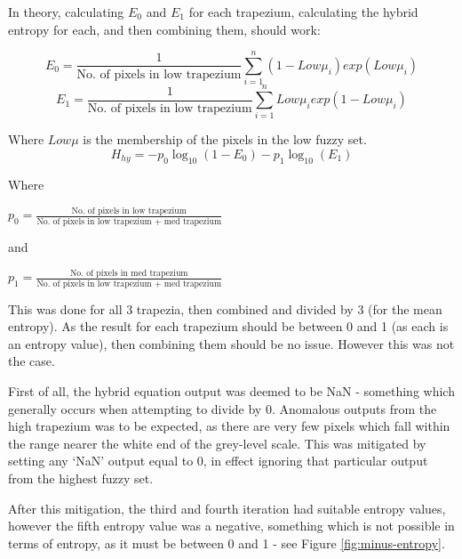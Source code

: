In theory, calculating $E_0$ and $E_1$ for each trapezium, calculating the hybrid entropy for each, and then combining them, should work:

\begin{equation}
E_0 = \frac{1}{\text{No. of pixels in low trapezium}}\displaystyle\sum_{i=1}^{n}{(1-Low\mu_i)exp(Low\mu_i)}
\end{equation}
\begin{equation}
E_1 = \frac{1}{\text{No. of pixels in low trapezium}}\displaystyle\sum_{i=1}^{n}{Low\mu_iexp(1-Low\mu_i)}
\end{equation}

Where $Low\mu$ is the membership of the pixels in the low fuzzy set.
\begin{equation}
H_{hy} = -p_0\log_{10}(1 - E_0) - p_1\log_{10}(E_1)
\end{equation}

Where

$p_0 = \frac{\text{No. of pixels in low trapezium}}{\text{No. of pixels in low trapezium + med trapezium}}$

and

$p_1 = \frac{\text{No. of pixels in med trapezium}}{\text{No. of pixels in low trapezium + med trapezium}}$

\vspace{1cm}

This was done for all 3 trapezia, then combined and divided by 3 (for the mean entropy). As the result for each trapezium should be between 0 and 1 (as each is an entropy value), then combining them should be no issue. However this was not the case.

First of all, the hybrid equation output was deemed to be \acrfull{NaN} - something which generally occurs when attempting to divide by 0. Anomalous outputs from the high trapezium was to be expected, as there are very few pixels which fall within the range nearer the white end of the grey-level scale. This was mitigated by setting any `\acrshort{NaN}' output equal to 0, in effect ignoring that particular output from the highest fuzzy set.

After this mitigation, the third and fourth iteration had suitable entropy values, however the fifth entropy value was a negative, something which is not possible in terms of entropy, as it must be between 0 and 1 - see Figure \ref{fig:minus-entropy}.

